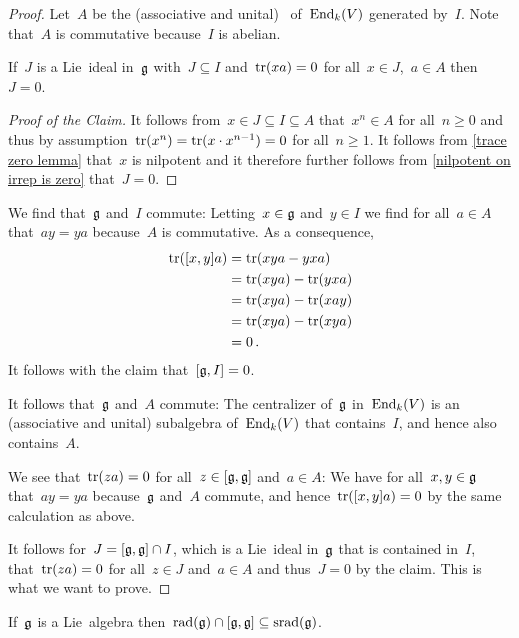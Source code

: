 \begin{proof}
  Let~$A$ be the (associative and unital)~{} of~$\operatorname{End}_k(V)$ generated by~$I$.
  Note that~$A$ is commutative because~$I$ is abelian.
  
  \begin{claim*}
    If~$J$ is a Lie~ideal in~$\mathfrak{g}$ with~$J \subseteq I$ and~$\operatorname{tr}(xa) = 0$ for all~$x \in J$,~$a \in A$ then~$J = 0$.
  \end{claim*}
  
  \begin{proof}[Proof of the Claim]
    It follows from~$x \in J \subseteq I \subseteq A$ that~$x^n \in A$ for all~$n \geq 0$ and thus by assumption~$\operatorname{tr}(x^n) = \operatorname{tr}(x \cdot x^{n-1}) = 0$ for all~$n \geq 1$.
    It follows from \cref{trace zero lemma} that~$x$ is nilpotent and it therefore further follows from \cref{nilpotent on irrep is zero} that~$J = 0$.
  \end{proof}

  We find that~$\mathfrak{g}$ and~$I$ commute:
  Letting~$x \in \mathfrak{g}$ and~$y \in I$ we find for all~$a \in A$ that~$ay = ya$ because~$A$ is commutative.
  As a consequence,
  \begin{align*}
    \operatorname{tr}([x,y] a)
    &=
    \operatorname{tr}(xya - yxa)
    \\
    &=
    \operatorname{tr}(xya) - \operatorname{tr}(yxa)
    \\
    &=
    \operatorname{tr}(xya) - \operatorname{tr}(xay)
    \\
    &=
    \operatorname{tr}(xya) - \operatorname{tr}(xya)
    \\
    &=
    0 \,.
  \end{align*}
  It follows with the claim that~$[\mathfrak{g}, I] = 0$.
  
  It follows that~$\mathfrak{g}$ and~$A$ commute:
  The centralizer of~$\mathfrak{g}$ in~$\operatorname{End}_k(V)$ is an (associative and unital) subalgebra of~$\operatorname{End}_k(V)$ that contains~$I$, and hence also contains~$A$.
  
  We see that~$\operatorname{tr}(za) = 0$ for all~$z \in [\mathfrak{g}, \mathfrak{g}]$ and~$a \in A$:
  We have for all~$x, y \in \mathfrak{g}$ that~$ay = ya$ because~$\mathfrak{g}$ and~$A$ commute, and hence~$\operatorname{tr}([x,y]a) = 0$ by the same calculation as above.
  
  It follows for~$J = [\mathfrak{g}, \mathfrak{g}] \cap I$, which is a Lie~ideal in~$\mathfrak{g}$ that is contained in~$I$, that~$\operatorname{tr}(za) = 0$ for all~$z \in J$ and~$a \in A$ and thus~$J = 0$ by the claim.
  This is what we want to prove.
\end{proof}

\begin{corollary}
  \label{inclusion intersection in srad}
  If~$\mathfrak{g}$ is a Lie~algebra then~$\operatorname{rad}(\mathfrak{g}) \cap [\mathfrak{g}, \mathfrak{g}] \subseteq \operatorname{srad}(\mathfrak{g})$.
\end{corollary}

